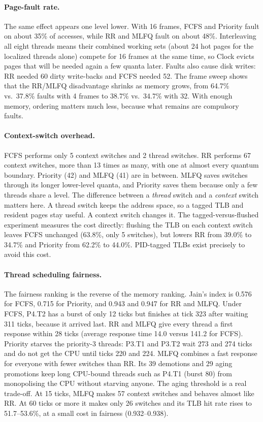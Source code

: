 \documentclass[11pt]{article}
\begin{document}
\paragraph{Page-fault rate.} The same effect appears one level lower. With 16 frames, FCFS and
Priority fault on about 35\% of accesses, while RR and MLFQ fault on about 48\%. Interleaving all
eight threads means their combined working sets (about 24 hot pages for the localized threads
alone) compete for 16 frames at the same time, so Clock evicts pages that will be needed again a
few quanta later. Faults also cause disk writes: RR needed 60 dirty write-backs and FCFS needed 52.
The frame sweep shows that the RR/MLFQ disadvantage shrinks as memory grows, from 64.7\% vs.\ 37.8\%
faults with 4 frames to 38.7\% vs.\ 34.7\% with 32. With enough memory, ordering matters much less,
because what remains are compulsory faults.

\paragraph{Context-switch overhead.} FCFS performs only 5 context switches and 2 thread switches.
RR performs 67 context switches, more than 13 times as many, with one at almost every quantum
boundary. Priority (42) and MLFQ (41) are in between. MLFQ saves switches through its longer
lower-level quanta, and Priority saves them because only a few threads share a level. The
difference between a \emph{thread} switch and a \emph{context} switch matters here. A thread switch
keeps the address space, so a tagged TLB and resident pages stay useful. A context switch changes
it. The tagged-versus-flushed experiment measures the cost directly: flushing the TLB on each
context switch leaves FCFS unchanged (63.8\%, only 5 switches), but lowers RR from 39.0\% to 34.7\%
and Priority from 62.2\% to 44.0\%. PID-tagged TLBs exist precisely to avoid this cost.

\paragraph{Thread scheduling fairness.} The fairness ranking is the reverse of the memory ranking.
Jain's index is 0.576 for FCFS, 0.715 for Priority, and 0.943 and 0.947 for RR and MLFQ. Under FCFS,
P4.T2 has a burst of only 12 ticks but finishes at tick 323 after waiting 311 ticks, because it
arrived last. RR and MLFQ give every thread a first response within 28 ticks (average response
time 14.0 versus 141.2 for FCFS). Priority starves the priority-3 threads: P3.T1 and P3.T2 wait 273
and 274 ticks and do not get the CPU until ticks 220 and 224. MLFQ combines a fast response for
everyone with fewer switches than RR. Its 39 demotions and 29 aging promotions keep long CPU-bound
threads such as P4.T1 (burst 80) from monopolising the CPU without starving anyone. The aging
threshold is a real trade-off. At 15 ticks, MLFQ makes 57 context switches and behaves almost like
RR. At 60 ticks or more it makes only 26 switches and its TLB hit rate rises to 51.7--53.6\%, at a
small cost in fairness (0.932--0.938).
\end{document}
